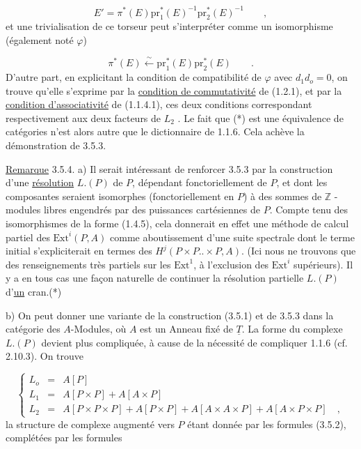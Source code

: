 \begin{equation*}
E' = \pi^*(E)\mathrm{pr}_1^*(E)^{-1}\mathrm{pr}_2^*(E)^{-1} \qquad ,
\end{equation*}
et une trivialisation de ce torseur peut s'interpréter comme un isomorphisme (également noté $\varphi$)

\begin{equation*}
\pi^*(E) \xleftarrow{\sim} \mathrm{pr}_1^*(E)\mathrm{pr}_2^*(E) \qquad .
\end{equation*}
D'autre part, en explicitant la condition de compatibilité de $\varphi$ avec $d_1 d_o = 0$, on trouve qu'elle s'exprime par la \underline{condition de commutativité} de (1.2.1), et par la \underline{condition d'associativité} de (1.1.4.1), ces deux conditions correspondant respectivement aux deux facteurs de $L_2$ . Le fait que (*) est une équivalence de catégories n'est alors autre que le dictionnaire de 1.1.6. Cela achève la démonstration de 3.5.3.

\underline{Remarque} 3.5.4. a)  Il serait intéressant de renforcer 3.5.3 par la construction d'une \underline{résolution} $L.(P)$ de $P$, dépendant fonctoriellement de $P$, et dont les composantes seraient isomorphes (fonctoriellement en $P$) à des sommes de $\mathbb{Z}$ -modules libres engendrés par des puissances cartésiennes
de $P$. Compte tenu des isomorphismes de la forme (1.4.5), cela donnerait en effet une méthode de calcul partiel des $\mathrm{Ext}^i(P,A)$ comme aboutissement d'une suite spectrale dont le terme  initial s'expliciterait en termes des $H^j(P \times P .. \times P, A)$. (Ici nous ne trouvons que des renseignements très partiels sur les $\mathrm{Ext}^1$, à l'exclusion des $\mathrm{Ext}^i$ supérieurs). Il y a en tous cas une façon naturelle de continuer la résolution partielle $L.(P)$ d'\underline{un} cran.(*)

b) On peut donner une variante de la construction (3.5.1) et de 3.5.3 dans la catégorie des $A$-Modules, où $A$ est un Anneau fixé de $\underline{T}$. La forme du complexe $L.(P)$ devient plus compliquée, à cause de la nécessité de compliquer 1.1.6 (cf. 2.10.3). On trouve

\begin{equation}\tag{3.5.5}
\left\{
\begin{array}{lcl}
L_o & = & A[P] \\[4pt]
L_1 & = & A[P \times P] + A[A \times P] \\[4pt]
L_2 & = & A[P \times P \times P] + A[P \times P] + A[A \times A \times P] + A[A \times P \times P] \quad ,
\end{array}
\right.
\end{equation}
la structure de complexe augmenté vers $P$ étant donnée par les formules (3.5.2), complétées par les formules

